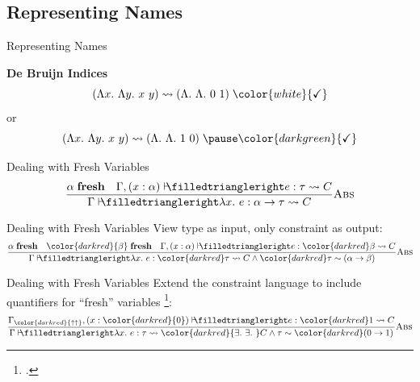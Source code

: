 \documentclass{beamer}
\newcommand{\predand}[2]{{#1}\;\mathit{#2}\quad}
\newcommand{\Inf}[3][!*NEVER USED ARGUMENT*!]{%
  \ifthenelse{\equal{#1}{!*NEVER USED ARGUMENT*!}}{%
    \dfrac{#2}{#3}
  }{%
    \dfrac{#2}{#3}(#1)
  }%
}
\newcommand{\vdasharrow}[0]{\vdash\!\!\!\!\filledtriangleright}
\begin{document}
\subsection {Representing Names}
\begin{frame}{Representing Names}
	\pause
	\begin{center}
		\textbf{De Bruijn Indices}
		\begin{displaymath}
			(\Lambda x.\ \Lambda y.\ x\ y) \leadsto (\Lambda.\ \Lambda.\ 0\ 1 ) \; \color{white}{\checkmark}
		\end{displaymath}\pause
		or
		\begin{displaymath}
			(\Lambda x.\ \Lambda y.\ x\ y) \leadsto (\Lambda.\ \Lambda.\ 1\ 0 ) \; \pause \color{darkgreen}{\checkmark}
		\end{displaymath}		
	\end{center}
\end{frame}
\begin{frame}{Dealing with Fresh Variables}	
	\begin{displaymath}
		\Inf{\predand{\alpha}{\textbf{fresh}} \Gamma, (x : \alpha) \vdasharrow e : \tau \leadsto C}{\Gamma \vdasharrow \lambda x.\ e : \alpha \rightarrow \tau \leadsto C}{\textsc{Abs}}
	\end{displaymath}
\end{frame}	
\begin{frame}{Dealing with Fresh Variables}	
	View type as input, only constraint as output:
	\begin{displaymath}
		\Inf{\predand{\alpha}{\textbf{fresh}}  {\color{darkred}\predand{\beta}{\textbf{fresh}}} \Gamma, (x : \alpha) \vdasharrow e : {\color{darkred}\beta} \leadsto C}{\Gamma \vdasharrow \lambda x.\ e : {\color{darkred}\tau} \leadsto C \land {\color{darkred} \tau \sim (\alpha \rightarrow \beta) }}{\textsc{Abs}}
	\end{displaymath}
\end{frame}	
\begin{frame}{Dealing with Fresh Variables}	Extend the constraint language to include quantifiers for ``fresh'' variables \footcite{Pottier:2005ue}:
	\begin{displaymath}
		\Inf{\Gamma_{\color{darkred}{\uparrow\uparrow}}, (x : {\color{darkred}{0}} ) \vdasharrow e : {\color{darkred} 1} \leadsto C}{\Gamma \vdasharrow \lambda x.\ e : \tau \leadsto {\color{darkred}{\exists.\ \exists.\ }}C \land \tau \sim {\color{darkred}(0 \rightarrow 1)}}{\textsc{Abs}}
	\end{displaymath}
\end{frame}	
\end{document}
